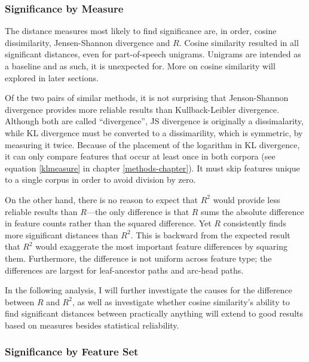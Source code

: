 \subsubsection{Significance by Measure}

The distance measures most likely to find significance are, in order,
cosine dissimilarity, Jensen-Shannon divergence and $R$. Cosine
similarity resulted in all significant distances, even for
part-of-speech unigrams. Unigrams are intended as a baseline and as
such, it is unexpected for. More on cosine similarity will explored
in later sections.

Of the two pairs of similar methods, it is not surprising that
Jenson-Shannon divergence provides more reliable results than
Kullback-Leibler divergence. Although both are called ``divergence'',
JS divergence is originally a dissimalarity, while KL divergence must
be converted to a dissimarility, which is symmetric, by measuring it
twice. Because of the placement of the logarithm in KL divergence, it
can only compare features that occur at least once in both corpora (see equation
\ref{klmeasure} in chapter \ref{methods-chapter}). It must skip
features unique to a single corpus in order to avoid division by zero.

On the other hand, there is no reason to expect that $R^2$ would
provide less reliable results than $R$---the only difference is that
$R$ sums the absolute difference in feature counts rather than the
squared difference. Yet $R$ consistently finds more significant
distances than $R^2$. This is backward from the expected result that
$R^2$ would exaggerate the most important feature differences by
squaring them. Furthermore, the difference is not uniform across feature
type; the differences are largest for leaf-ancestor paths and
arc-head paths.

In the following analysis, I will further investigate the causes for the difference
between $R$ and $R^2$, as well as investigate whether cosine
similarity's ability to find significant distances between practically
anything will extend to good results based on measures besides
statistical reliability.

\subsubsection{Significance by Feature Set}


